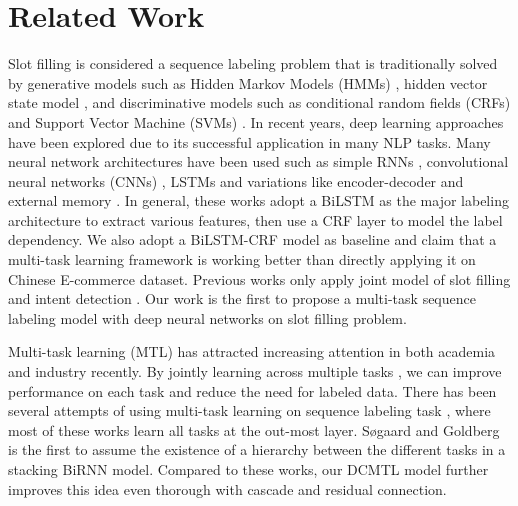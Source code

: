 \section{Related Work}


Slot filling is considered a sequence labeling problem that is 
traditionally solved by generative models 
such as Hidden Markov Models (HMMs) \cite{wang2005spoken},
hidden vector state model \cite{he2003data}, 
and discriminative models such as 
conditional random fields (CRFs) \cite{raymond2007generative,lafferty2001conditional} 
and Support Vector Machine (SVMs) \cite{kudo2001chunking}.
In recent years,
deep learning approaches have been explored
due to its successful application in many NLP tasks.
Many neural network architectures have been used such as
simple RNNs \cite{yao2013recurrent,mesnil2015using}, 
convolutional neural networks (CNNs) \cite{xu2013convolutional},
LSTMs \cite{yao2014spoken} 
and variations like encoder-decoder \cite{zhu2017encoder,zhai2017neural} 
and external memory \cite{peng2015recurrent}.
In general, these works adopt a BiLSTM as the major labeling architecture
to extract various features, 
then use a CRF layer \cite{huang2015bidirectional} to model 
the label dependency.
We also adopt a BiLSTM-CRF model as baseline and claim that
a multi-task learning framework is working better than directly 
applying it on Chinese E-commerce dataset.
Previous works
only apply joint model of slot filling and intent detection \cite{zhang2016joint,liu2016joint}.
Our work is the first to propose a multi-task sequence labeling model with 
deep neural networks on slot filling problem.

Multi-task learning (MTL) has attracted increasing attention
in both academia and industry recently.
By jointly learning across multiple tasks \cite{caruana1998multitask}, we can
improve performance on each task and reduce the need for labeled data.
There has been several attempts of using multi-task learning on 
sequence labeling task \cite{peng2016multi,peng2016improving,yang2017transfer},
where most of these works learn all tasks at the out-most layer.
Søgaard and Goldberg  is the first to 
assume the existence of a hierarchy between the different tasks in a stacking BiRNN model.
Compared to these works, our DCMTL model further improves this 
idea even thorough with cascade and residual connection.


